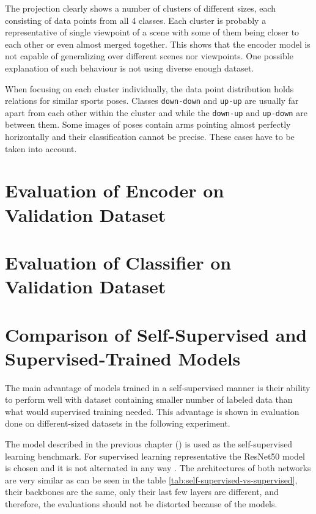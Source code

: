 The projection clearly shows a number of clusters of different sizes, each consisting of data points from all 4 classes. Each cluster is probably a representative of single viewpoint of a scene with some of them being closer to each other or even almost merged together. This shows that the encoder model is not capable of generalizing over different scenes nor viewpoints. One possible explanation of such behaviour is not using diverse enough dataset.

When focusing on each cluster individually, the data point distribution holds relations for similar sports poses. Classes \texttt{down-down} and \texttt{up-up} are usually far apart from each other within the cluster and while the \texttt{down-up} and \texttt{up-down} are between them. Some images of poses contain arms pointing almost perfectly horizontally and their classification cannot be precise. These cases have to be taken into account.

\section{\label{sec:evaluate-encoder}Evaluation of Encoder on Validation Dataset}

\section{\label{sec:evaluate-classifier}Evaluation of Classifier on Validation Dataset}

\section{\label{sec:comparison}Comparison of Self-Supervised and Supervised-Trained Models}

The main advantage of models trained in a self-supervised manner is their ability to perform well with dataset containing smaller number of labeled data than what would supervised training needed. This advantage is shown in evaluation done on different-sized datasets in the following experiment.

The model described in the previous chapter () is used as the self-supervised learning benchmark. For supervised learning representative the ResNet50 model is chosen and it is not alternated in any way \cite{he2015deep}. The architectures of both networks are very similar as can be seen in the table \ref{tab:self-supervised-vs-supervised}, their backbones are the same, only their last few layers are different, and therefore, the evaluations should not be distorted because of the models.

